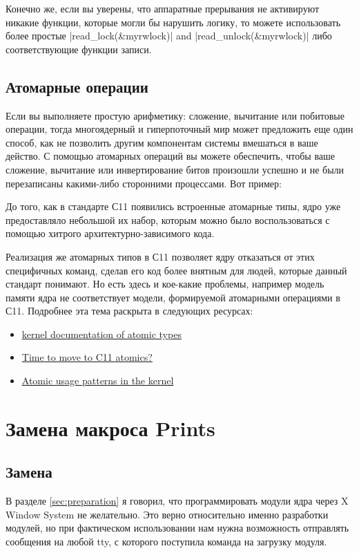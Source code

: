 \documentclass[10pt, oneside]{book}
\begin{document}

Конечно же, если вы уверены, что аппаратные прерывания не активируют никакие функции, которые могли бы нарушить логику, то можете использовать более простые \cpp|read_lock(&myrwlock)| and \cpp|read_unlock(&myrwlock)| либо соответствующие функции записи.
\subsection{Атомарные операции}
\label{sec:atomics}
Если вы выполняете простую арифметику: сложение, вычитание или побитовые операции, тогда многоядерный и гиперпоточный мир может предложить еще один способ, как не позволить другим компонентам системы вмешаться в ваше действо. С помощью атомарных операций вы можете обеспечить, чтобы ваше сложение, вычитание или инвертирование битов произошли успешно и не были перезаписаны какими-либо сторонними процессами. Вот пример:


До того, как в стандарте С11 появились встроенные атомарные типы, ядро уже предоставляло небольшой их набор, которым можно было воспользоваться с помощью
хитрого архитектурно-зависимого кода.

Реализация же атомарных типов в С11 позволяет ядру отказаться от этих специфичных команд, сделав его код более внятным для людей, которые данный стандарт понимают. Но есть здесь и кое-какие проблемы, например модель памяти ядра не соответствует модели, формируемой атомарными операциями в С11. Подробнее эта тема раскрыта в следующих ресурсах:
\begin{itemize}
 \item \href{https://www.kernel.org/doc/Documentation/atomic_t.txt}{kernel documentation of atomic types}
 \item \href{https://lwn.net/Articles/691128/}{Time to move to C11 atomics?}
 \item \href{https://lwn.net/Articles/698315/}{Atomic usage patterns in the kernel}
\end{itemize}

\section{Замена макроса Prints}
\label{sec:print_macros}
\subsection{Замена}
В разделе \ref{sec:preparation} я говорил, что программировать модули ядра через X Window System не желательно. Это верно относительно именно разработки модулей, но при фактическом использовании нам нужна возможность отправлять сообщения на любой tty, с которого поступила команда на загрузку модуля.
\end{document}
